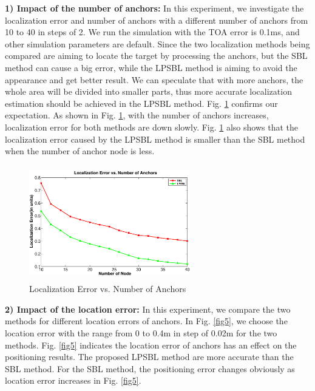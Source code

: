 \textbf{1) Impact of the number of anchors:}
 In this experiment, we investigate the localization error and number of anchors with a different number of anchors from 10 to 40 in steps of 2. 
 We run the simulation with the TOA error is 0.1ms, and other simulation parameters are default. 
 Since the two localization methods being compared are aiming to locate the target by processing the anchors, 
 but the SBL method can cause a big error, while the LPSBL method is aiming to avoid the appearance and get better result. 
 We can speculate that with more anchors, the whole area will be divided into smaller parts, 
 thus more accurate localization estimation should be achieved in the LPSBL method. 
Fig. \ref{fig4} confirms our expectation. As shown in Fig. \ref{fig4}, with the number of anchors increases, localization error for both  methods are down slowly. 
Fig. \ref{fig4} also shows that the localization error caused by the LPSBL method is smaller than the SBL method when the number of anchor node is less.
  \begin{figure}[htb]
            \setlength{\abovecaptionskip}{0pt}
			 \vspace{-15mm}
           		 \includegraphics[height=5.0cm,width=7.0cm]{image/fig4.eps}
            \vspace{15mm}
            \caption{Localization Error vs. Number of Anchors}
             \vspace{-7mm}
             \label{fig4}
        \end{figure}		
\textbf{2) Impact of the location error:}
 In this experiment, we compare the two methods for different location errors of anchors. 
 In Fig. \ref{fig5}, we choose the location error with the range from 0 to 0.4m in step of 0.02m for the two methods. 
 Fig. \ref{fig5} indicates the location error of anchors has an effect on the positioning results. 
 The proposed LPSBL method are more accurate than the SBL method. 
 For the SBL method, the positioning error changes obviously as location error increases in Fig. \ref{fig5}. 
